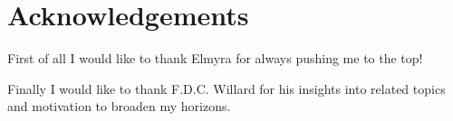 \documentclass[../bachelor_paper.tex]{subfiles}
\begin{document}
\section*{Acknowledgements}
    \label{chap:acknowledgements}
    \thispagestyle{empty}
    
    First of all I would like to thank Elmyra for always pushing me to the top!

    Finally I would like to thank F.D.C. Willard for his insights into related topics and motivation to broaden my horizons.
\end{document}
